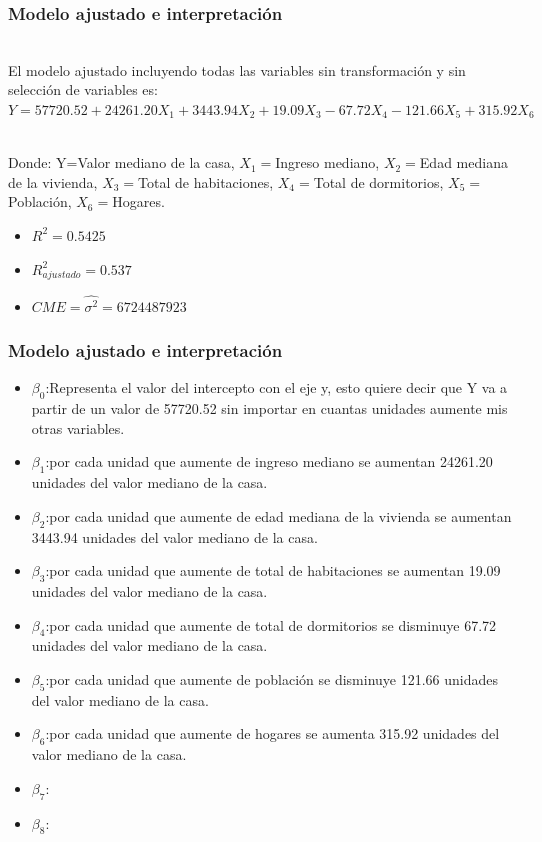 \documentclass[12pt]{beamer}
\begin{document}
\begin{frame}
\frametitle{Modelo ajustado e interpretación}
~\\ El modelo ajustado incluyendo todas las variables sin transformación y sin selección de variables es:
~\\ $Y=57720.52+24261.20X_{1}+3443.94X_{2}+19.09X_{3}-67.72X_{4}-121.66X_{5}+315.92X_{6}$

~\\ Donde: Y=Valor mediano de la casa, $X_{1}=$Ingreso mediano, $X_{2}=$Edad mediana de la vivienda, $X_{3}=$Total de habitaciones, $X_{4}=$Total de dormitorios, $X_{5}=$Población, $X_{6}=$Hogares.
\begin{itemize}
\item $R^2=0.5425$
\item $R^2_{ajustado}=0.537$
\item $CME=\hat{\sigma^2}=6724487923$
\end{itemize}
\end{frame}


\begin{frame}
\frametitle{Modelo ajustado e interpretación}
\begin{itemize}
\item $\beta_{0}$:Representa el valor del intercepto con el eje y, esto quiere decir que Y va a partir de un valor de 57720.52 sin importar en cuantas unidades aumente mis otras variables.  
\item $\beta_{1}$:por cada unidad que aumente de ingreso mediano se aumentan 24261.20 unidades del valor mediano de la casa.
\item $\beta_{2}$:por cada unidad que aumente de edad mediana de la vivienda se aumentan 3443.94 unidades del valor mediano de la casa.
\item $\beta_{3}$:por cada unidad que aumente de total de habitaciones se aumentan 19.09 unidades del valor mediano de la casa.
\item $\beta_{4}$:por cada unidad que aumente de total de dormitorios se disminuye 67.72 unidades del valor mediano de la casa.
\end{itemize}
\end{frame}
\begin{frame}
\begin{itemize}
\item $\beta_{5}$:por cada unidad que aumente de población se disminuye 121.66 unidades del valor mediano de la casa.
\item $\beta_{6}$:por cada unidad que aumente de hogares se aumenta 315.92 unidades del valor mediano de la casa.
\item $\beta_{7}$:
\item $\beta_{8}$:
\end{itemize}
\end{frame}
\end{document}
